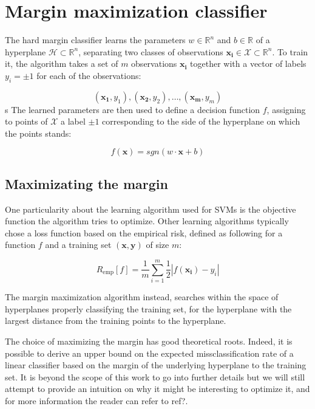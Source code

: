 \section {Margin maximization classifier}

The hard margin classifier learns the parameters $w \in \mathbb{R}^n$ and $b \in \mathbb{R}$ of a hyperplane $\mathscr{H} \subset \mathbb{R}^n$, separating two classes of observations $\mathbf{x_i} \in \mathcal{X} \subset \mathbb{R}^n$. To train it, the algorithm takes a set of $m$ observations $\mathbf{x_i}$ together with a vector of labels $y_i = \pm 1$ for each of the observations:

$$
(\mathbf{x_1}, y_1), (\mathbf{x_2}, y_2), \dotsc, (\mathbf{x_m}, y_m)
$$
s
The learned parameters are then used to define a decision function $f$, assigning to points of $\mathcal{X}$ a label $\pm 1$ corresponding to the side of the hyperplane on which the points stands:

\begin{equation}
  f(\mathbf{x}) = sgn(w \cdot \mathbf{x} + b)
\end{equation}

\subsection {Maximizating the margin}

One particularity about the learning algorithm used for SVMs is the objective function the algorithm tries to optimize. Other learning algorithms typically chose a loss function based on the empirical risk, defined as following for a function $f$ and a training set $(\mathbf{x}, \mathbf{y})$ of size $m$:

\begin{equation}
  R_{\text{emp}}[f] = \frac{1}{m}\sum^m_{i=1}\frac{1}{2}|f(\mathbf{x_i}) - y_i|
\end{equation}

The margin maximization algorithm instead, searches within the space of hyperplanes properly classifying the training set, for the hyperplane with the largest distance from the training points to the hyperplane.

The choice of maximizing the margin has good theoretical roots. Indeed, it is possible to derive an upper bound on the expected missclassification rate of a linear classifier based on the margin of the underlying hyperplane to the training set. It is beyond the scope of this work to go into further details but we will still attempt to provide an intuition on why it might be interesting to optimize it, and for more information the reader can refer to  \textcolor[rgb]{1,0,0}{ref?}.

